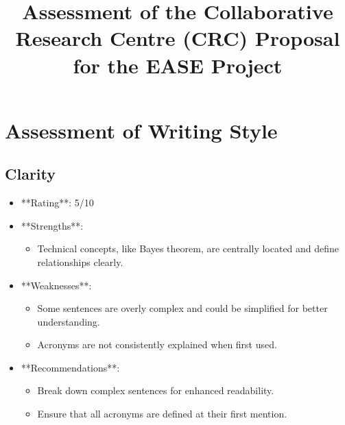 \documentclass[11pt]{article}
\title{Assessment of the Collaborative Research Centre (CRC) Proposal for the EASE Project}
\author{}
\date{}
\begin{document}
\maketitle

\section{Assessment of Writing Style}

\subsection{Clarity}
\begin{itemize}
    \item **Rating**: 5/10
    \item **Strengths**:
        \begin{itemize}
            \item Technical concepts, like Bayes theorem, are centrally located and define relationships clearly.
        \end{itemize}
    \item **Weaknesses**:
        \begin{itemize}
            \item Some sentences are overly complex and could be simplified for better understanding.
            \item Acronyms are not consistently explained when first used.
        \end{itemize}
    \item **Recommendations**:
        \begin{itemize}
            \item Break down complex sentences for enhanced readability.
            \item Ensure that all acronyms are defined at their first mention.
        \end{itemize}
\end{itemize}
\end{document}
